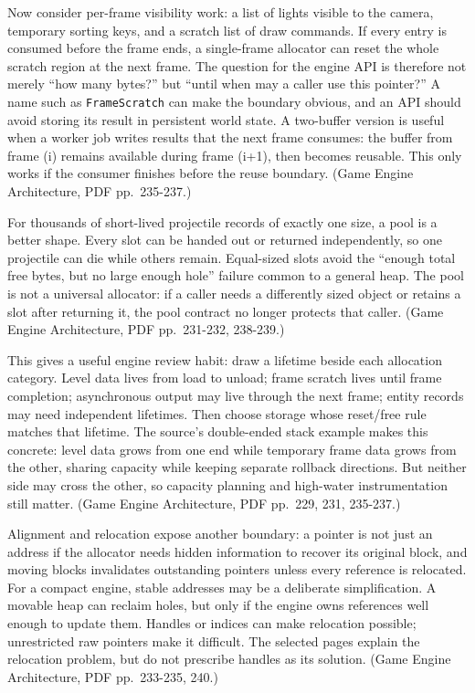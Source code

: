Now consider per-frame visibility work: a list of lights visible to the camera, temporary sorting keys, and a scratch list of draw commands. If every entry is consumed before the frame ends, a single-frame allocator can reset the whole scratch region at the next frame. The question for the engine API is therefore not merely ``how many bytes?'' but ``until when may a caller use this pointer?'' A name such as \texttt{FrameScratch} can make the boundary obvious, and an API should avoid storing its result in persistent world state. A two-buffer version is useful when a worker job writes results that the next frame consumes: the buffer from frame (i) remains available during frame (i+1), then becomes reusable. This only works if the consumer finishes before the reuse boundary. (Game Engine Architecture, PDF pp.~235-237.)

For thousands of short-lived projectile records of exactly one size, a pool is a better shape. Every slot can be handed out or returned independently, so one projectile can die while others remain. Equal-sized slots avoid the ``enough total free bytes, but no large enough hole'' failure common to a general heap. The pool is not a universal allocator: if a caller needs a differently sized object or retains a slot after returning it, the pool contract no longer protects that caller. (Game Engine Architecture, PDF pp.~231-232, 238-239.)

This gives a useful engine review habit: draw a lifetime beside each allocation category. Level data lives from load to unload; frame scratch lives until frame completion; asynchronous output may live through the next frame; entity records may need independent lifetimes. Then choose storage whose reset/free rule matches that lifetime. The source's double-ended stack example makes this concrete: level data grows from one end while temporary frame data grows from the other, sharing capacity while keeping separate rollback directions. But neither side may cross the other, so capacity planning and high-water instrumentation still matter. (Game Engine Architecture, PDF pp.~229, 231, 235-237.)

Alignment and relocation expose another boundary: a pointer is not just an address if the allocator needs hidden information to recover its original block, and moving blocks invalidates outstanding pointers unless every reference is relocated. For a compact engine, stable addresses may be a deliberate simplification. A movable heap can reclaim holes, but only if the engine owns references well enough to update them. Handles or indices can make relocation possible; unrestricted raw pointers make it difficult. The selected pages explain the relocation problem, but do not prescribe handles as its solution. (Game Engine Architecture, PDF pp.~233-235, 240.)

